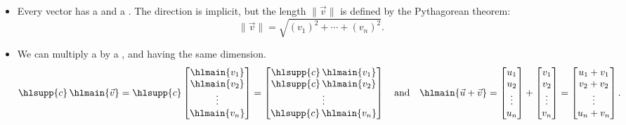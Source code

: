 \documentclass[../main.tex]{subfiles}
\begin{document}
\begin{itemize}[wide]

  \item Every vector has a  and a . The direction is implicit, but the length \(\|\vec{v}\|\) is defined by the Pythagorean theorem:
    \begin{equation}
      \| \vec{v} \| = \sqrt{ (v_{1})^{2} + \cdots + (v_{n})^{2} }.
    \end{equation}

  \item We can multiply a  by a , and  having the same dimension.
    \begin{equation}
      \hlsupp{c}\, \hlmain{\vec{v}}
      = 
      \hlsupp{c}
      \begin{bmatrix}
        \hlmain{v_{1}} \\ \hlmain{v_{2}} \\ \vdots \\ \hlmain{v_{n}}
      \end{bmatrix}
      =
      \begin{bmatrix}
        \hlsupp{c}\, \hlmain{v_{1}} \\ \hlsupp{c}\, \hlmain{v_{2}} \\ \vdots \\ \hlsupp{c}\, \hlmain{v_{n}}
      \end{bmatrix}
      \quad\text{and}\quad
      \hlmain{\vec{u} + \vec{v}}
      =
      \begin{bmatrix}
        u_{1} \\ u_{2} \\ \vdots \\ u_{n}
      \end{bmatrix}
      +
      \begin{bmatrix}
        v_{1} \\ v_{2} \\ \vdots \\ v_{n}
      \end{bmatrix}
      =
      \begin{bmatrix}
        u_{1} + v_{1} \\ v_{2} + v_{2} \\ \vdots \\ u_{n} + v_{n}
      \end{bmatrix}.
    \end{equation}



\end{itemize}
\end{document}
